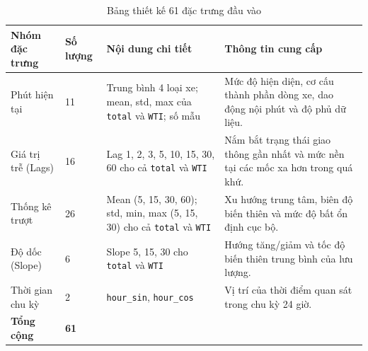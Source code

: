 \begin{table}[htbp]
        \centering
        \caption{Bảng thiết kế 61 đặc trưng đầu vào}
        \vspace{0.2cm}
        \begin{tabular}{|p{3.2cm}|p{1.5cm}|p{5.5cm}|p{6cm}|}
            \hline
            \textbf{Nhóm đặc trưng} & \textbf{Số lượng} & \textbf{Nội dung chi tiết} & \textbf{Thông tin cung cấp} \\
            \hline
            Phút hiện tại & 11 & Trung bình 4 loại xe; mean, std, max của \texttt{total} và \texttt{WTI}; số mẫu & Mức độ hiện diện, cơ cấu thành phần dòng xe, dao động nội phút và độ phủ dữ liệu. \\
            \hline
            Giá trị trễ (Lags) & 16 & Lag 1, 2, 3, 5, 10, 15, 30, 60 cho cả \texttt{total} và \texttt{WTI} & Nắm bắt trạng thái giao thông gần nhất và mức nền tại các mốc xa hơn trong quá khứ. \\
            \hline
            Thống kê trượt & 26 & Mean (5, 15, 30, 60); std, min, max (5, 15, 30) cho cả \texttt{total} và \texttt{WTI} & Xu hướng trung tâm, biên độ biến thiên và mức độ bất ổn định cục bộ. \\
            \hline
            Độ dốc (Slope) & 6 & Slope 5, 15, 30 cho \texttt{total} và \texttt{WTI} & Hướng tăng/giảm và tốc độ biến thiên trung bình của lưu lượng. \\
            \hline
            Thời gian chu kỳ & 2 & \texttt{hour\_sin}, \texttt{hour\_cos} & Vị trí của thời điểm quan sát trong chu kỳ 24 giờ. \\
            \hline
            \textbf{Tổng cộng} & \textbf{61} & \multicolumn{2}{p{11.5cm}|}{} \\
            \hline
        \end{tabular}
    \end{table}